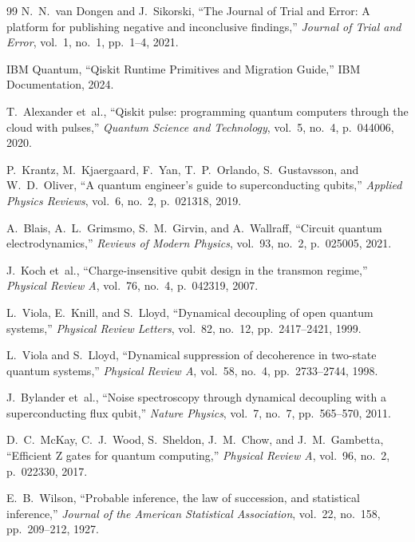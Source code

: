 \documentclass[11pt,a4paper]{article}
\begin{document}

\begin{thebibliography}{99}
N.~N.~van Dongen and J.~Sikorski,
``The Journal of Trial and Error: A platform for publishing negative and inconclusive findings,''
\emph{Journal of Trial and Error}, vol.~1, no.~1, pp.~1--4, 2021.

IBM Quantum,
``Qiskit Runtime Primitives and Migration Guide,''
IBM Documentation, 2024.

T.~Alexander et~al.,
``Qiskit pulse: programming quantum computers through the cloud with pulses,''
\emph{Quantum Science and Technology}, vol.~5, no.~4, p.~044006, 2020.

P.~Krantz, M.~Kjaergaard, F.~Yan, T.~P.~Orlando, S.~Gustavsson, and W.~D.~Oliver,
``A quantum engineer's guide to superconducting qubits,''
\emph{Applied Physics Reviews}, vol.~6, no.~2, p.~021318, 2019.

A.~Blais, A.~L.~Grimsmo, S.~M.~Girvin, and A.~Wallraff,
``Circuit quantum electrodynamics,''
\emph{Reviews of Modern Physics}, vol.~93, no.~2, p.~025005, 2021.

J.~Koch et~al.,
``Charge-insensitive qubit design in the transmon regime,''
\emph{Physical Review A}, vol.~76, no.~4, p.~042319, 2007.

L.~Viola, E.~Knill, and S.~Lloyd,
``Dynamical decoupling of open quantum systems,''
\emph{Physical Review Letters}, vol.~82, no.~12, pp.~2417--2421, 1999.

L.~Viola and S.~Lloyd,
``Dynamical suppression of decoherence in two-state quantum systems,''
\emph{Physical Review A}, vol.~58, no.~4, pp.~2733--2744, 1998.

J.~Bylander et~al.,
``Noise spectroscopy through dynamical decoupling with a superconducting flux qubit,''
\emph{Nature Physics}, vol.~7, no.~7, pp.~565--570, 2011.

D.~C.~McKay, C.~J.~Wood, S.~Sheldon, J.~M.~Chow, and J.~M.~Gambetta,
``Efficient Z gates for quantum computing,''
\emph{Physical Review A}, vol.~96, no.~2, p.~022330, 2017.

E.~B.~Wilson,
``Probable inference, the law of succession, and statistical inference,''
\emph{Journal of the American Statistical Association}, vol.~22, no.~158, pp.~209--212, 1927.
\end{thebibliography}
\end{document}
